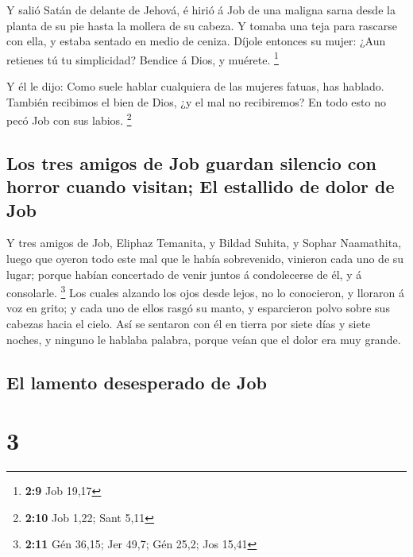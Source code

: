  Y salió Satán de delante de Jehová, é hirió á Job de una
maligna sarna desde la planta de su pie hasta la mollera de su cabeza.
 Y tomaba una teja para rascarse con ella, y estaba sentado
en medio de ceniza.  Díjole entonces su mujer: ¿Aun retienes
tú tu simplicidad? Bendice á Dios, y muérete. \footnote{\textbf{2:9} Job
  19,17}

 Y él le dijo: Como suele hablar cualquiera de las mujeres
fatuas, has hablado. También recibimos el bien de Dios, ¿y el mal no
recibiremos? En todo esto no pecó Job con sus labios. \footnote{\textbf{2:10}
  Job 1,22; Sant 5,11}

\hypertarget{los-tres-amigos-de-job-guardan-silencio-con-horror-cuando-visitan-el-estallido-de-dolor-de-job}{%
\subsection{Los tres amigos de Job guardan silencio con horror cuando
visitan; El estallido de dolor de
Job}\label{los-tres-amigos-de-job-guardan-silencio-con-horror-cuando-visitan-el-estallido-de-dolor-de-job}}

 Y tres amigos de Job, Eliphaz Temanita, y Bildad Suhita, y
Sophar Naamathita, luego que oyeron todo este mal que le había
sobrevenido, vinieron cada uno de su lugar; porque habían concertado de
venir juntos á condolecerse de él, y á consolarle. \footnote{\textbf{2:11}
  Gén 36,15; Jer 49,7; Gén 25,2; Jos 15,41}  Los cuales
alzando los ojos desde lejos, no lo conocieron, y lloraron á voz en
grito; y cada uno de ellos rasgó su manto, y esparcieron polvo sobre sus
cabezas hacia el cielo.  Así se sentaron con él en tierra
por siete días y siete noches, y ninguno le hablaba palabra, porque
veían que el dolor era muy grande.

\hypertarget{el-lamento-desesperado-de-job}{%
\subsection{El lamento desesperado de
Job}\label{el-lamento-desesperado-de-job}}

\hypertarget{section-2}{%
\section{3}\label{section-2}}

